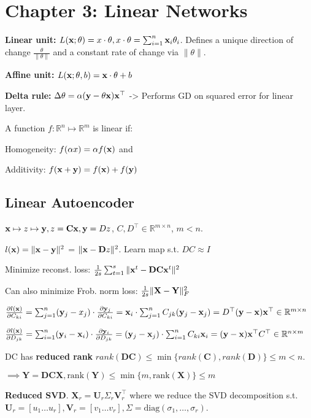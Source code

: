 \section*{Chapter 3: Linear Networks}

\textbf{Linear unit:} $L(\mathbf{x};\theta) = x\cdot\theta, x\cdot\theta=\sum_{i=1}^n \mathbf{x}_i\theta_i$. Defines a unique direction of change $\frac{\theta}{\|\theta\|}$ and a constant rate of change via $\|\theta\|$.

\textbf{Affine unit:} $L(\mathbf{x};\theta, b) = \mathbf{x}\cdot\theta + b$

\textbf{Delta rule: } $\Delta\theta = \alpha(\mathbf{y}-\theta \mathbf{x})\mathbf{x}^\top$ -> Performs GD on squared error for linear layer.

A function $f: \mathbb{R}^n \mapsto \mathbb{R}^m$ is linear if:

Homogeneity: $f(\alpha x) = \alpha f(\mathbf{x})$ and

Additivity: $f(\mathbf{x}+\mathbf{y}) = f(\mathbf{x}) + f(\mathbf{y})$

\subsection*{Linear Autoencoder}
$\mathbf{x} \mapsto z \mapsto \mathbf{y}, z=\mathbf{C}\mathbf{x}, \mathbf{y}=Dz$, $C, D^\top \in \mathbb{R}^{m\times n}$, $m<n$. 

$l(\mathbf{x}) = \|\mathbf{x}-\mathbf{y}\|^2$ = $\|\mathbf{x}-\mathbf{D}z\|^2$. Learn map s.t. $DC \approx I$

Minimize reconst. loss: $\frac{1}{2s}\sum_{t=1}^s\|\mathbf{x}^t-\mathbf{DC}\mathbf{x}^t\|^2$

Can also minimize Frob. norm loss: $\frac{1}{2s}\|\mathbf{X}-\mathbf{Y}\|_F^2$

$\frac{\partial l(\mathbf{x})}{\partial C_{ki}} = \sum_{j=1}^{n}(\mathbf{y}_j-x_j)\cdot \frac{\partial \mathbf{y}_j}{\partial C_{ki}} = \mathbf{x}_i \cdot \sum_{j=1}^nC_{jk}(\mathbf{y}_j-\mathbf{x}_j) = D^\top(\mathbf{y}-\mathbf{x})\mathbf{x}^\top  \in \mathbb{R}^{m\times n}$

$\frac{\partial l(\mathbf{x})}{\partial D_{jk}} = \sum_{i=1}^{n}(\mathbf{y}_i-\mathbf{x}_i)\cdot \frac{\partial \mathbf{y}_i}{\partial D_{jk}} = (\mathbf{y}_j-\mathbf{x}_j) \cdot \sum_{i=1}^nC_{ki}\mathbf{x}_i = (\mathbf{y}-\mathbf{x})\mathbf{x}^\top C^\top \in \mathbb{R}^{n\times m}$

DC has \textbf{reduced rank} $rank(\mathbf{DC}) \leq \min\{rank(\mathbf{C}), rank(\mathbf{D})\} \leq m < n$.

$\implies \mathbf{Y} = \mathbf{DCX}, \text{rank}(\mathbf{Y})\leq\min\{m, \text{rank}(\mathbf{X})\} \leq m$

\textbf{Reduced SVD}. $\mathbf{X}_r = \mathbf{U}_r\Sigma_r\mathbf V_r^\top$ where we reduce the SVD decomposition s.t. $\mathbf{U}_r = [u_1 \hdots u_r], \mathbf{V}_r = [v_1 \hdots v_r], \Sigma = \text{diag}(\sigma_1, \hdots, \sigma_r)$.

